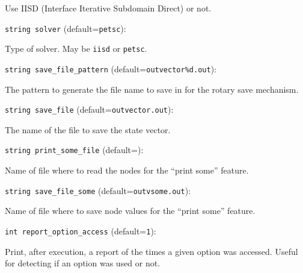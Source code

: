 Use IISD (Interface Iterative Subdomain Direct) or not.

\item\verb+string solver+ {\rm(default=\verb|petsc|)}:

Type of solver. May be \verb+iisd+ or \verb+petsc+. 

\item\verb+string save_file_pattern+ {\rm(default=\verb|outvector%d.out|)}:

The pattern to generate the file name to save in for
the rotary save mechanism.

\item\verb+string save_file+ {\rm(default=\verb|outvector.out|)}:

The name of the file to save the state vector. 

\item\verb+string print_some_file+ {\rm(default=\verb||)}:

Name of file where to read the nodes for the ``print some'' 
feature. 

\item\verb+string save_file_some+ {\rm(default=\verb|outvsome.out|)}:

Name of file where to save node values for the ``print some'' 
feature. 

\item\verb+int report_option_access+ {\rm(default=\verb|1|)}:

Print, after execution, a report of the times a given option
was accessed. Useful for detecting if an option was used or not.

